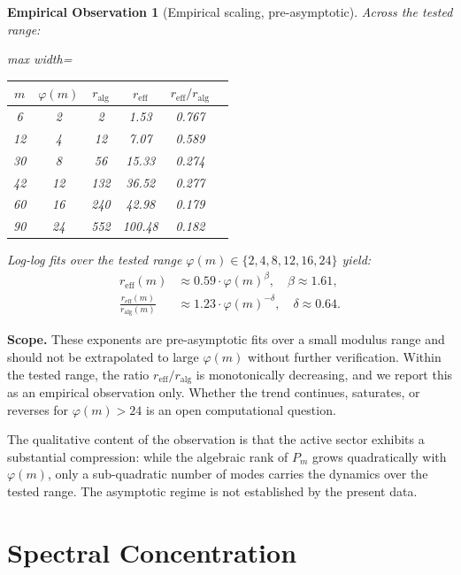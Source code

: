 \documentclass[11pt,a4paper]{article}
\newtheorem{observation}{Empirical Observation}
\begin{document}
\begin{observation}[Empirical scaling, pre-asymptotic]
\label{obs:scaling}
Across the tested range:

\begin{center}
\begin{adjustbox}{max width=\linewidth}\begin{tabular}{cccccc}
\toprule
$m$ & $\varphi(m)$ & $r_{\text{alg}}$ & $r_{\text{eff}}$ & $r_{\text{eff}}/r_{\text{alg}}$ \\
\midrule
6 & 2 & 2 & 1.53 & 0.767 \\
12 & 4 & 12 & 7.07 & 0.589 \\
30 & 8 & 56 & 15.33 & 0.274 \\
42 & 12 & 132 & 36.52 & 0.277 \\
60 & 16 & 240 & 42.98 & 0.179 \\
90 & 24 & 552 & 100.48 & 0.182 \\
\bottomrule
\end{tabular}\end{adjustbox}
\end{center}

Log-log fits over the tested range $\varphi(m) \in \{2, 4, 8, 12, 16, 24\}$ yield:
\begin{align}
r_{\text{eff}}(m) &\approx 0.59 \cdot \varphi(m)^{\beta}, \quad \beta \approx 1.61,\\
\frac{r_{\text{eff}}(m)}{r_{\text{alg}}(m)} &\approx 1.23 \cdot \varphi(m)^{-\delta}, \quad \delta \approx 0.64.
\end{align}
\end{observation}

\textbf{Scope.} These exponents are pre-asymptotic fits over a small modulus range and should not be extrapolated to large $\varphi(m)$ without further verification. Within the tested range, the ratio $r_{\text{eff}}/r_{\text{alg}}$ is monotonically decreasing, and we report this as an empirical observation only. Whether the trend continues, saturates, or reverses for $\varphi(m) > 24$ is an open computational question.

The qualitative content of the observation is that the active sector exhibits a substantial compression: while the algebraic rank of $P_m$ grows quadratically with $\varphi(m)$, only a sub-quadratic number of modes carries the dynamics over the tested range. The asymptotic regime is not established by the present data.

\section{Spectral Concentration}
\label{sec:spectrum}
\end{document}
